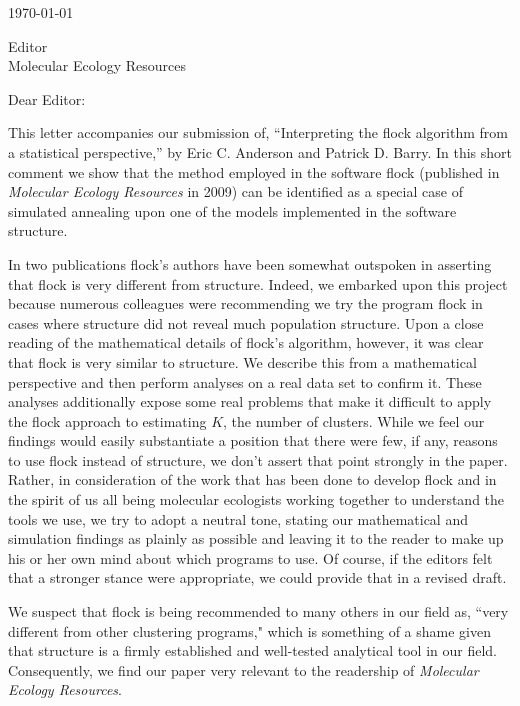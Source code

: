 \documentclass[11pt]{letter}
\date{}
\begin{document}
\begin{letter}{ \today 

Editor \\
Molecular Ecology Resources\\
}

\opening{Dear Editor:}
This letter accompanies our submission of, ``Interpreting the {\sc flock} algorithm from a statistical perspective,'' by Eric C. Anderson and Patrick D. Barry.  In this short comment we show that the method employed in the software {\sc flock} (published in {\em Molecular Ecology Resources} in 2009) can be identified as a special case of simulated annealing upon one of the models implemented in the software {\sc structure}.  

In two publications {\sc flock}'s authors have been somewhat outspoken in asserting that {\sc flock} is very different from {\sc structure}. Indeed, we embarked upon this project because numerous colleagues were recommending we try the program {\sc flock} in cases where {\sc structure} did not reveal much population structure.  Upon a close reading of the mathematical details of {\sc flock}'s algorithm, however, it was clear that {\sc flock} is very similar to {\sc structure}.  We describe this from a mathematical perspective and then perform analyses on a real data set to confirm it.  These analyses additionally expose some real problems that make it difficult to apply the {\sc flock} approach to estimating $K$, the number of clusters.  While we feel our findings would easily substantiate a position that there were few, if any, reasons to use {\sc flock} instead of {\sc structure}, we don't assert that point strongly in the paper. Rather, in consideration of the work that has been done to develop {\sc flock} and in the spirit of us all being molecular ecologists working together to understand the tools we use, we try to adopt a neutral tone, stating our mathematical and simulation findings as plainly as possible and leaving it to the reader to make up his or her own mind about which programs to use.  Of course, if the editors felt that a stronger stance were appropriate, we could provide that in a revised draft.


We suspect that {\sc flock} is being recommended to many others in our field as, ``very different from other clustering programs," which is something of a shame given that {\sc structure} is a firmly established and well-tested analytical tool in our field.  Consequently, we find our paper very relevant to the readership of {\em Molecular Ecology Resources}. 


\end{letter}
\end{document}
